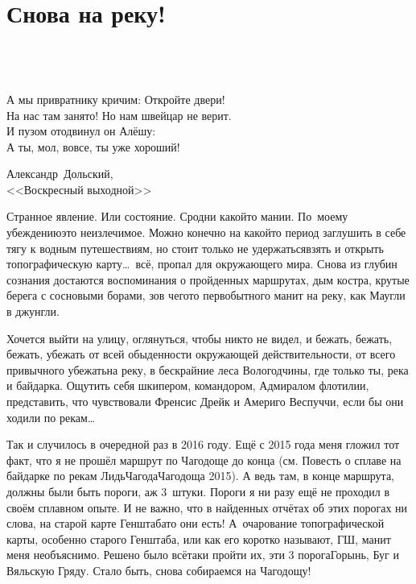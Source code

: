 \chapter{Снова на реку!} 

\setlength{\epigraphwidth}{0.68\textwidth}

\epigraph{%
	~\\
	~\\		
	~\\		
	А мы привратнику кричим: Откройте двери! \\
	На нас там занято! Но нам швейцар не верит. \\
	И пузом отодвинул он Алёшу: \\
	А ты, мол, вовсе, ты уже хороший!}
	{
	\begin{flushright}
		\small{Александр~Дольский,\\<<Воскресный выходной>>}
	\end{flushright}
	}

Странное явление. Или состояние. Сродни какой\sdash то мании. По~моему убеждению\mdash это неизлечимое. Можно конечно на какой\sdash то период заглушить в себе тягу к водным путешествиям, но стоит только не удержаться\mdash взять и открыть топографическую карту\ldots~всё, пропал для окружающего мира. Снова из глубин сознания достаются воспоминания о пройденных маршрутах, дым костра, крутые берега с сосновыми борами, зов чего\sdash то первобытного манит на реку, как Маугли в джунгли. 

Хочется выйти на улицу, оглянуться, чтобы никто не видел, и бежать, бежать, бежать, убежать от всей обыденности окружающей действительности, от всего привычного убежать\mdash на реку, в бескрайние леса Вологодчины, где только ты, река и байдарка. Ощутить себя шкипером, командором, Адмиралом флотилии, представить, что чувствовали Френсис Дрейк и Америго Веспуччи, если бы они ходили по рекам\ldots 

Так и случилось в очередной раз в 2016 году. Ещё с 2015 года меня гложил тот факт, что я не прошёл маршрут по Чагодоще до конца (см. Повесть о сплаве на байдарке по рекам Лидь\sdash Чагода\sdash Чагодоща 2015). А ведь там, в конце маршрута, должны были быть пороги, аж 3~штуки. Пороги я ни разу ещё не проходил в своём сплавном опыте. И не важно, что в найденных отчётах об этих порогах ни слова, на старой карте Генштаба\sdash то они есть! А~очарование топографической карты, особенно старого Генштаба, или как его коротко называют, ГШ, манит меня необъяснимо. Решено было всё\sdash таки пройти их, эти 3 порога\mdash Горынь, Буг и Вяльскую Гряду. Стало быть, снова собираемся на Чагодощу!

